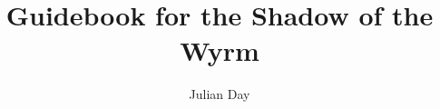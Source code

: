 \documentclass{article}
\begin{document}
\title{Guidebook for the Shadow of the Wyrm}
\author{Julian Day}
\maketitle
\thispagestyle{empty}

\newpage
\clearpage
\thispagestyle{empty}

\tableofcontents

\newpage
\setcounter{page}{1}





\end{document}
